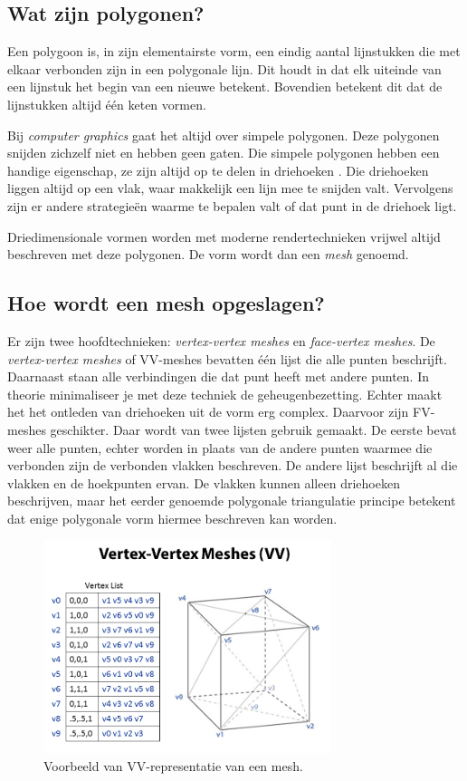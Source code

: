 \documentclass[12pt, a4paper]{article}
\begin{document}
\subsection{Wat zijn polygonen?}
Een polygoon is, in zijn elementairste vorm, een eindig aantal lijnstukken die met elkaar verbonden zijn in een polygonale lijn. Dit houdt in dat elk uiteinde van een lijnstuk het begin van een nieuwe betekent. Bovendien betekent dit dat de lijnstukken altijd één keten vormen. 

Bij \textit{computer graphics} gaat het altijd over simpele polygonen. Deze polygonen snijden zichzelf niet en hebben geen gaten. Die simpele polygonen hebben een handige eigenschap, ze zijn altijd op te delen in driehoeken \cite{10.2307/2319703}. Die driehoeken liggen altijd op een vlak, waar makkelijk een lijn mee te snijden valt. Vervolgens zijn er andere strategieën waarme te bepalen valt of dat punt in de driehoek ligt. 

Driedimensionale vormen worden met moderne rendertechnieken vrijwel altijd beschreven met deze polygonen. De vorm wordt dan een \emph{mesh} genoemd.

\subsection{Hoe wordt een mesh opgeslagen?}
Er zijn twee hoofdtechnieken: \emph{vertex-vertex meshes} \cite{VVSystems} en \emph{face-vertex meshes}. De \emph{vertex-vertex meshes} of VV-meshes bevatten één lijst die alle punten beschrijft. Daarnaast staan alle verbindingen die dat punt heeft met andere punten. In theorie minimaliseer je met deze techniek de geheugenbezetting. Echter maakt het het ontleden van driehoeken uit de vorm erg complex. Daarvoor zijn FV-meshes geschikter. Daar wordt van twee lijsten gebruik gemaakt. De eerste bevat weer alle punten, echter worden in plaats van de andere punten waarmee die verbonden zijn de verbonden vlakken beschreven. De andere lijst beschrijft al die vlakken en de hoekpunten ervan. De vlakken kunnen alleen driehoeken beschrijven, maar het eerder genoemde polygonale triangulatie principe betekent dat enige polygonale vorm hiermee beschreven kan worden.

\begin{figure}[H]
    \centering
    \includegraphics[width=0.75\textwidth]{Vertex-Vertex_Meshes.png}
    \caption{Voorbeeld van VV-representatie van een mesh.}
    \label{fig:vertex_vertex}
\end{figure}
\end{document}
